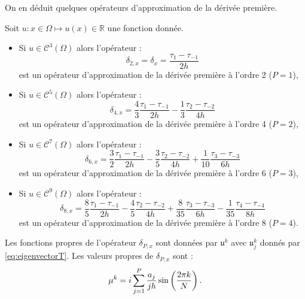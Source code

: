On en déduit quelques opérateurs d'approximation de la dérivée première.
\begin{corollaire}
Soit $u :  x \in \Omega \mapsto u(x) \in \mathbb{R}$ une fonction donnée. 
\begin{itemize}
\item Si $u \in \mathcal{C}^3 (\Omega)$ alors l'opérateur :
\begin{equation}
\delta_{2,x} = \delta_x = \dfrac{\tau_1 - \tau_{-1}}{2h}
\label{eq:derprem_order2}
\end{equation}
est un opérateur d'approximation de la dérivée première à l'ordre 2 ($P=1$),
\item Si $u \in \mathcal{C}^5 (\Omega)$ alors l'opérateur :
\begin{equation}
\delta_{4,x} = \dfrac{4}{3} \dfrac{\tau_1 - \tau_{-1}}{2h} - \dfrac{1}{3} \dfrac{\tau_2 - \tau_{-2}}{4h}
\label{eq:derprem_order4}
\end{equation}
est un opérateur d'approximation de la dérivée première à l'ordre 4 ($P=2$),
\item Si $u \in \mathcal{C}^7 (\Omega)$ alors l'opérateur :
\begin{equation}
\delta_{6,x} = \dfrac{3}{2} \dfrac{\tau_1 - \tau_{-1}}{2h} - \dfrac{3}{5} \dfrac{\tau_2 - \tau_{-2}}{4h} + \dfrac{1}{10} \dfrac{\tau_3 - \tau_{-3}}{6h}
\label{eq:derprem_order6}
\end{equation}
est un opérateur d'approximation de la dérivée première à l'ordre 6 ($P=3$),
\item Si $u \in \mathcal{C}^9 (\Omega)$ alors l'opérateur :
\begin{equation}
\delta_{8,x} = \dfrac{8}{5} \dfrac{\tau_1 - \tau_{-1}}{2h} - \dfrac{4}{5} \dfrac{\tau_2 - \tau_{-2}}{4h} + \dfrac{8}{35} \dfrac{\tau_3 - \tau_{-3}}{6h} - \dfrac{1}{35} \dfrac{\tau_4 - \tau_{-4}}{8h}
\label{eq:derprem_order8}
\end{equation}
est un opérateur d'approximation de la dérivée première à l'ordre 8 ($P=4$).
\end{itemize}
\end{corollaire}



\begin{theoreme}Les fonctions propres de l'opérateur $\delta_{P,x}$ sont données par $\mathfrak{u}^k$ avec $\mathfrak{u}^k_j$ donnés par \eqref{eq:eigenvectorT}.
Les valeurs propres de $\delta_{P,x}$ sont :
\begin{equation}
\mu^k = i \displaystyle\sum\limits_{j=1}^P \dfrac{a_j}{j h} \sin \left( \dfrac{2 \pi k}{N} \right).
\end{equation}
\label{prop:eigen_explicit}
\end{theoreme}

